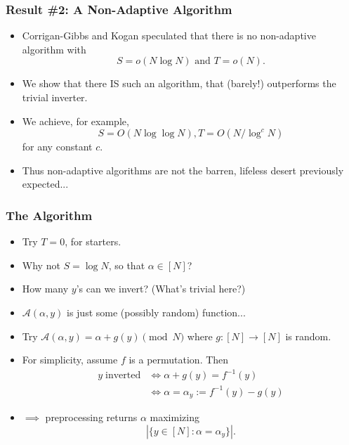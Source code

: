 \documentclass[usenames, dvipsnames, t, table]{beamer}
\newcommand{\A}{\mathcal{A}}
\begin{document}
  \begin{frame}
    \frametitle{Result \#2: A Non-Adaptive Algorithm}
    \begin{itemize}
    \item Corrigan-Gibbs and Kogan speculated that there is no non-adaptive algorithm with
      \[S = o(N \log N) \text{ and } T = o(N).\]
      \nocite{CorriganGibbs19}
    \item We show that there IS such an algorithm, that (barely!) outperforms the trivial inverter.
      \pause
    \item We achieve, for example,
      \[S = O(N \log \log N), T = O(N / \log^c N)\]
      for any constant $c$.
          \mypause
          \item Thus non-adaptive algorithms are not the barren, lifeless desert previously expected...
    \end{itemize}
  \end{frame}

  \begin{frame}
    \frametitle{The Algorithm}
    \begin{itemize}
    \item Try $T = 0$, for starters.
      \pause
    \item Why not $S = \log N$, so that $\alpha \in [N]$?
      \pause
    \item How many $y$'s can we invert? (What's trivial here?)
      \pause
    \item $\A(\alpha, y)$ is just some (possibly random) function...
      \pause
    \item Try $\A(\alpha, y) = \alpha + g(y) \pmod N$ where $g: [N] \to [N]$ is random.
      \pause
  \item For simplicity, assume $f$ is a permutation. Then
    \begin{align*}
      y \; \text{inverted} &\Leftrightarrow \alpha + g(y) = f^{-1}(y) \\
                        &\Leftrightarrow \alpha = \alpha_y := f^{-1}(y) - g(y)
    \end{align*}
    \mypause
  \item $\implies$ preprocessing returns $\alpha$ maximizing
\[|\{y \in [N] : \alpha = \alpha_y\}|.\]
    \end{itemize}
  \end{frame}
\end{document}
